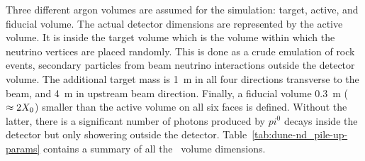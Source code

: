 Three different argon volumes are assumed for the simulation: target, active, and fiducial volume.
The actual detector dimensions are represented by the active volume.
It is inside the target volume which is the volume within which the neutrino vertices are placed randomly.
This is done as a crude emulation of rock events, secondary particles from beam neutrino interactions outside the detector volume.
The additional target mass is \SI{1}{\metre} in all four directions transverse to the beam, and \SI{4}{\metre} in upstream beam direction.
Finally, a fiducial volume \SI{0.3}{\metre} ($\approx 2 X_{\mathrm{0}}$) smaller than the active volume on all six faces is defined.
Without the latter, there is a significant number of photons produced by $pi^0$ decays inside the detector but only showering outside the detector.
Table~\ref{tab:dune-nd_pile-up-params} contains a summary of all the \lar\ volume dimensions.

